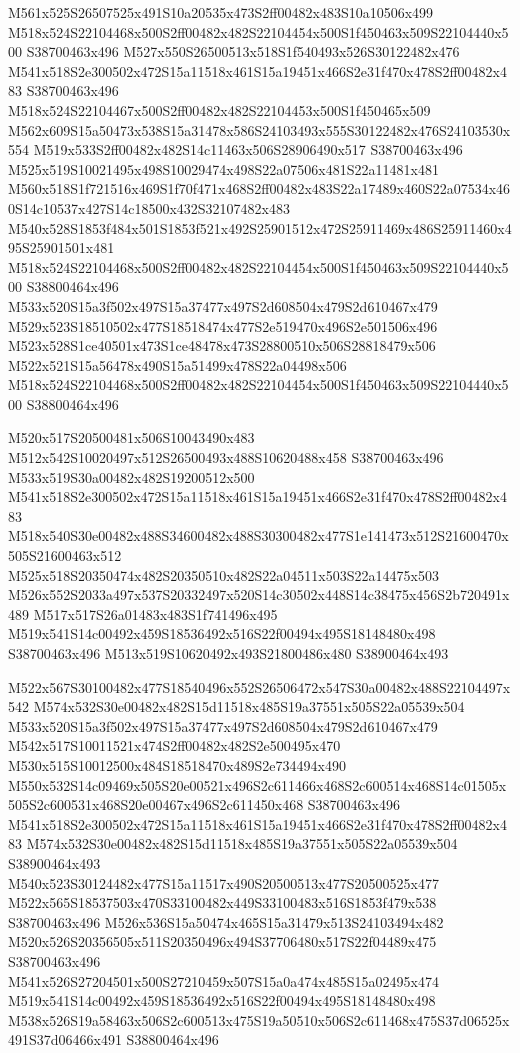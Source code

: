 \documentclass{article}
\begin{document}
\begin{multicols}{2}
M561x525S26507525x491S10a20535x473S2ff00482x483S10a10506x499 M518x524S22104468x500S2ff00482x482S22104454x500S1f450463x509S22104440x500 S38700463x496 M527x550S26500513x518S1f540493x526S30122482x476 M541x518S2e300502x472S15a11518x461S15a19451x466S2e31f470x478S2ff00482x483 S38700463x496 M518x524S22104467x500S2ff00482x482S22104453x500S1f450465x509 M562x609S15a50473x538S15a31478x586S24103493x555S30122482x476S24103530x554 M519x533S2ff00482x482S14c11463x506S28906490x517 S38700463x496 M525x519S10021495x498S10029474x498S22a07506x481S22a11481x481 M560x518S1f721516x469S1f70f471x468S2ff00482x483S22a17489x460S22a07534x460S14c10537x427S14c18500x432S32107482x483 M540x528S1853f484x501S1853f521x492S25901512x472S25911469x486S25911460x495S25901501x481 M518x524S22104468x500S2ff00482x482S22104454x500S1f450463x509S22104440x500 S38800464x496 M533x520S15a3f502x497S15a37477x497S2d608504x479S2d610467x479 M529x523S18510502x477S18518474x477S2e519470x496S2e501506x496 M523x528S1ce40501x473S1ce48478x473S28800510x506S28818479x506 M522x521S15a56478x490S15a51499x478S22a04498x506 M518x524S22104468x500S2ff00482x482S22104454x500S1f450463x509S22104440x500 S38800464x496


M520x517S20500481x506S10043490x483 M512x542S10020497x512S26500493x488S10620488x458 S38700463x496 M533x519S30a00482x482S19200512x500 M541x518S2e300502x472S15a11518x461S15a19451x466S2e31f470x478S2ff00482x483 M518x540S30e00482x488S34600482x488S30300482x477S1e141473x512S21600470x505S21600463x512 M525x518S20350474x482S20350510x482S22a04511x503S22a14475x503 M526x552S2033a497x537S20332497x520S14c30502x448S14c38475x456S2b720491x489 M517x517S26a01483x483S1f741496x495 M519x541S14c00492x459S18536492x516S22f00494x495S18148480x498 S38700463x496 M513x519S10620492x493S21800486x480 S38900464x493

M522x567S30100482x477S18540496x552S26506472x547S30a00482x488S22104497x542 M574x532S30e00482x482S15d11518x485S19a37551x505S22a05539x504 M533x520S15a3f502x497S15a37477x497S2d608504x479S2d610467x479 M542x517S10011521x474S2ff00482x482S2e500495x470 M530x515S10012500x484S18518470x489S2e734494x490 M550x532S14c09469x505S20e00521x496S2c611466x468S2c600514x468S14c01505x505S2c600531x468S20e00467x496S2c611450x468 S38700463x496 M541x518S2e300502x472S15a11518x461S15a19451x466S2e31f470x478S2ff00482x483 M574x532S30e00482x482S15d11518x485S19a37551x505S22a05539x504 S38900464x493 M540x523S30124482x477S15a11517x490S20500513x477S20500525x477 M522x565S18537503x470S33100482x449S33100483x516S1853f479x538 S38700463x496 M526x536S15a50474x465S15a31479x513S24103494x482 M520x526S20356505x511S20350496x494S37706480x517S22f04489x475 S38700463x496 M541x526S27204501x500S27210459x507S15a0a474x485S15a02495x474 M519x541S14c00492x459S18536492x516S22f00494x495S18148480x498 M538x526S19a58463x506S2c600513x475S19a50510x506S2c611468x475S37d06525x491S37d06466x491 S38800464x496


\end{multicols}
\end{document}
